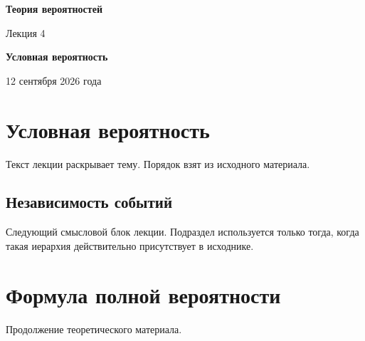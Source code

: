 \documentclass[a4paper,12pt]{article}
\begin{document}
\begin{center}
    {\Large\bfseries Теория вероятностей}

    \vspace{0.3em}

    {\large Лекция 4}

    \vspace{0.3em}

    \textbf{Условная вероятность}

    \vspace{0.3em}

    {\small 12 сентября 2026 года}
\end{center}

\vspace{1em}

\section{Условная вероятность}

Текст лекции раскрывает тему. Порядок взят из исходного материала.


\subsection{Независимость событий}

Следующий смысловой блок лекции. Подраздел используется только тогда, когда
такая иерархия действительно присутствует в исходнике.

\section{Формула полной вероятности}

Продолжение теоретического материала.
\end{document}
